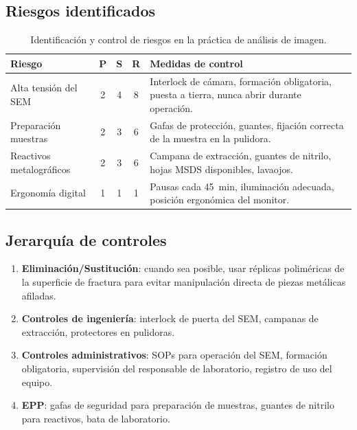 \documentclass[12pt,a4paper]{article}
\begin{document}
\subsection{Riesgos identificados}

\begin{table}[H]
	\centering
	\caption{Identificación y control de riesgos en la práctica de análisis
		de imagen.}
	\label{tab:riesgos}
	\small
	\begin{tabularx}{\textwidth}{l c c c X}
		\toprule
		\textbf{Riesgo} & \textbf{P}                                      & \textbf{S} & \textbf{R}
		                & \textbf{Medidas de control}                                               \\
		\midrule
		Alta tensión del SEM
		                & 2                                               & 4          & 8
		                & Interlock de cámara, formación obligatoria,
		puesta a tierra, nunca abrir durante operación.                                             \\
		Preparación muestras
		                & 2                                               & 3          & 6
		                & Gafas de protección, guantes, fijación correcta
		de la muestra en la pulidora.                                                               \\
		Reactivos metalográficos
		                & 2                                               & 3          & 6
		                & Campana de extracción, guantes de nitrilo,
		hojas MSDS disponibles, lavaojos.                                                           \\
		Ergonomía digital
		                & 1                                               & 1          & 1
		                & Pausas cada 45~min, iluminación adecuada,
		posición ergonómica del monitor.                                                            \\
		\bottomrule
	\end{tabularx}
\end{table}

\subsection{Jerarquía de controles}

\begin{enumerate}
	\item \textbf{Eliminación/Sustitución}: cuando sea posible, usar réplicas
	      poliméricas de la superficie de fractura para evitar manipulación
	      directa de piezas metálicas afiladas.
	\item \textbf{Controles de ingeniería}: interlock de puerta del SEM,
	      campanas de extracción, protectores en pulidoras.
	\item \textbf{Controles administrativos}: SOPs para operación del SEM,
	      formación obligatoria, supervisión del responsable de laboratorio,
	      registro de uso del equipo.
	\item \textbf{EPP}: gafas de seguridad para preparación de muestras,
	      guantes de nitrilo para reactivos, bata de laboratorio.
\end{enumerate}
\end{document}
